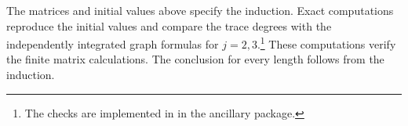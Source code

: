 The matrices and initial values above specify the induction. Exact
computations reproduce the initial values and compare the trace degrees
with the independently integrated graph formulas for $j=2,3$.\footnote{The
checks are implemented in
\href{https://github.com/bwuebben/toric-tangent-stability/blob/main/paper2/paper/anc/code/compute06_cycle_tables.py}{}
in the ancillary package.}
These computations verify the finite matrix calculations. The conclusion
for every length follows from the induction.
